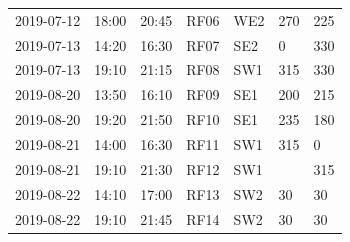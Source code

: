 \documentclass[draft]{agujournal2019}
\begin{document}
\begin{table}
\begin{tabular}{lllllll}
2019-07-12 & 18:00            & 20:45          & RF06                                                    & WE2                                                     & 270                                                     & 225                                                      \\
2019-07-13 & 14:20            & 16:30          & RF07                                                    & SE2                                                     & 0                                                       & 330                                                      \\
2019-07-13 & 19:10            & 21:15          & RF08                                                    & SW1                                                     & 315                                                     & 330                                                      \\
2019-08-20 & 13:50            & 16:10          & RF09                                                    & SE1                                                     & 200                                                     & 215                                                      \\
2019-08-20 & 19:20            & 21:50          & RF10                                                    & SE1                                                     & 235                                                     & 180                                                      \\
2019-08-21 & 14:00            & 16:30          & RF11                                                    & SW1                                                     & 315                                                     & 0                                                        \\
2019-08-21 & 19:10            & 21:30          & RF12                                                    & SW1                                                     &                                                         & 315                                                      \\
2019-08-22 & 14:10            & 17:00          & RF13                                                    & SW2                                                     & 30                                                      & 30                                                       \\
2019-08-22 & 19:10            & 21:45          & RF14                                                    & SW2                                                     & 30                                                      & 30                                                       \\

\end{tabular}
\end{table}
\end{document}
